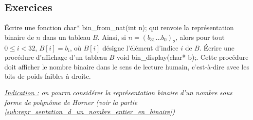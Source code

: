 \documentclass[../../../main.tex]{subfiles}
\begin{document}
\subsection{Exercices}
Écrire une fonction \textsf{char* bin\_from\_nat(int n);} qui renvoie la représentation binaire de $n$ dans un tableau $B$. Ainsi, si $n = (b_{31}\dots b_{0})_2$, alors pour tout $0 \leq i < 32$, $B[i] = b_i$, où $B[i]$ désigne l'élément d'indice $i$ de $B$. Écrire une procédure d'affichage d'un tableau $B$ \textsf{void bin\_display(char* b);}. Cette procédure doit afficher le nombre binaire dans le sens de lecture humain, c'est-à-dire avec les bits de poids faibles à droite.

\textit{\underline{Indication :} on pourra considérer la représentation binaire d'un nombre sous forme de polynôme de Horner (voir la partie \ref{sub:repr_sentation_d_un_nombre_entier_en_binaire})}
\end{document}

